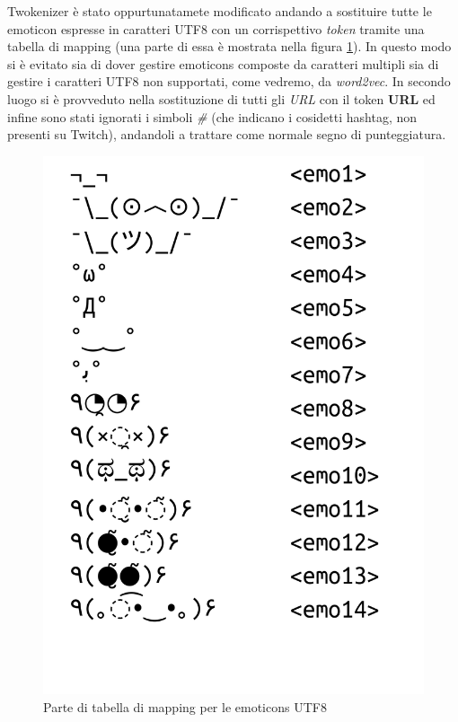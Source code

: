 \documentclass[a4paper,12pt,openright,twoside]{report}
\theoremstyle{definition}
\begin{document}
Twokenizer è stato oppurtunatamete
modificato andando a sostituire tutte le emoticon espresse in caratteri UTF8 con un corrispettivo \emph{token}
tramite una tabella di mapping (una parte di essa è mostrata nella figura \ref{fig:mappingEmo}). In
questo modo si è evitato sia di dover gestire emoticons composte da caratteri multipli sia di gestire
i caratteri UTF8 non supportati, come vedremo, da \emph{word2vec}.
In secondo luogo si è provveduto nella sostituzione di tutti gli \emph{URL} con il token \textbf{URL} ed infine
sono stati ignorati i simboli \emph{\#} (che indicano i cosidetti hashtag, non presenti su Twitch),
andandoli a trattare come normale segno di punteggiatura.

\begin{figure}[ht]
	\centering
	\includegraphics[scale=0.3]{Immagini/emoticonsTable.pdf}
	\caption{Parte di tabella di mapping per le emoticons UTF8}
	\label{fig:mappingEmo}
\end{figure}
\end{document}
